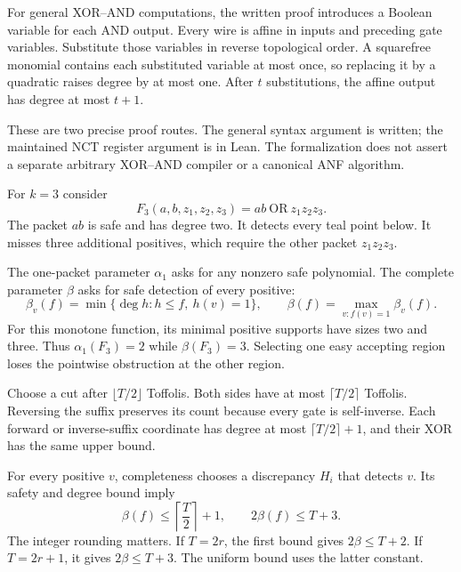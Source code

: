 For general XOR--AND computations, the written proof introduces a Boolean
variable for each AND output. Every wire is affine in inputs and preceding
gate variables. Substitute those variables in reverse topological order.
A squarefree monomial contains each substituted variable at most once,
so replacing it by a quadratic raises degree by at most one. After $t$
substitutions, the affine output has degree at most $t+1$.

These are two precise proof routes. The general syntax argument is written;
the maintained NCT register argument is in Lean. The formalization does not
assert a separate arbitrary XOR--AND compiler or a canonical ANF algorithm.


For $k=3$ consider
\[
 F_3(a,b,z_1,z_2,z_3)=ab\ \mathrm{OR}\ z_1z_2z_3.
\]
The packet $ab$ is safe and has degree two. It detects every teal point
below. It misses three additional positives, which require the other
packet $z_1z_2z_3$.


The one-packet parameter $\alpha_1$ asks for any nonzero safe polynomial.
The complete parameter $\beta$ asks for safe detection of every positive:
\[
 \beta_v(f)=\min\{\deg h:h\le f,\ h(v)=1\},\qquad
 \beta(f)=\max_{v:f(v)=1}\beta_v(f).
\]
For this monotone function, its minimal positive supports have sizes two
and three. Thus $\alpha_1(F_3)=2$ while $\beta(F_3)=3$. Selecting one
easy accepting region loses the pointwise obstruction at the other region.


Choose a cut after $\lfloor T/2\rfloor$ Toffolis. Both sides have at most
$\lceil T/2\rceil$ Toffolis. Reversing the suffix preserves its count because
every gate is self-inverse. Each forward or inverse-suffix coordinate has
degree at most $\lceil T/2\rceil+1$, and their XOR has the same upper bound.

For every positive $v$, completeness chooses a discrepancy $H_i$ that
detects $v$. Its safety and degree bound imply
\[
 \beta(f)\le\left\lceil\frac T2\right\rceil+1,
 \qquad 2\beta(f)\le T+3.
\]
The integer rounding matters. If $T=2r$, the first bound gives
$2\beta\le T+2$. If $T=2r+1$, it gives $2\beta\le T+3$.
The uniform bound uses the latter constant.

